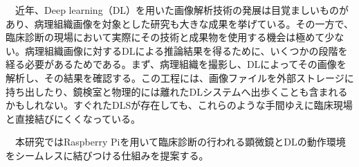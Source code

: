 　近年、Deep learning（DL）を用いた画像解析技術の発展は目覚ましいものがあり、病理組織画像を対象とした研究も大きな成果を挙げている。その一方で、臨床診断の現場において実際にその技術と成果物を使用する機会は極めて少ない。病理組織画像に対するDLによる推論結果を得るために、いくつかの段階を経る必要があるためである。まず、病理組織を撮影し、DLによってその画像を解析し、その結果を確認する。この工程には、画像ファイルを外部ストレージに持ち出したり、鏡検室と物理的には離れたDLシステムへ出歩くことも含まれるかもしれない。すぐれたDLSが存在しても、これらのような手間ゆえに臨床現場と直接結びにくくなっている。\par
\vspace{0.5zh}
　本研究ではRaspberry Piを用いて臨床診断の行われる顕微鏡とDLの動作環境をシームレスに結びつける仕組みを提案する。\par
